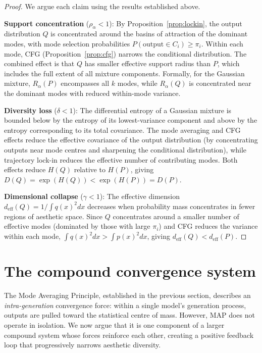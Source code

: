 \documentclass[11pt]{article}
\begin{document}
\begin{proof}
We argue each claim using the results established above.

\textbf{Support concentration} ($\rho_\alpha < 1$): By Proposition~\ref{prop:lockin}, the output distribution $Q$ is concentrated around the basins of attraction of the dominant modes, with mode selection probabilities $P(\text{output} \in C_i) \geq \pi_i$. Within each mode, CFG (Proposition~\ref{prop:cfg}) narrows the conditional distribution. The combined effect is that $Q$ has smaller effective support radius than $P$, which includes the full extent of all mixture components. Formally, for the Gaussian mixture, $R_\alpha(P)$ encompasses all $k$ modes, while $R_\alpha(Q)$ is concentrated near the dominant modes with reduced within-mode variance.

\textbf{Diversity loss} ($\delta < 1$): The differential entropy of a Gaussian mixture is bounded below by the entropy of its lowest-variance component and above by the entropy corresponding to its total covariance. The mode averaging and CFG effects reduce the effective covariance of the output distribution (by concentrating outputs near mode centres and sharpening the conditional distribution), while trajectory lock-in reduces the effective number of contributing modes. Both effects reduce $H(Q)$ relative to $H(P)$, giving $D(Q) = \exp(H(Q)) < \exp(H(P)) = D(P)$.

\textbf{Dimensional collapse} ($\gamma < 1$): The effective dimension $d_{\mathrm{eff}}(Q) = 1/\int q(x)^2 dx$ decreases when probability mass concentrates in fewer regions of aesthetic space. Since $Q$ concentrates around a smaller number of effective modes (dominated by those with large $\pi_i$) and CFG reduces the variance within each mode, $\int q(x)^2 dx > \int p(x)^2 dx$, giving $d_{\mathrm{eff}}(Q) < d_{\mathrm{eff}}(P)$.
\end{proof}

\section{The compound convergence system}\label{sec:compound}

The Mode Averaging Principle, established in the previous section, describes an \textit{intra-generation} convergence force: within a single model's generation process, outputs are pulled toward the statistical centre of mass. However, MAP does not operate in isolation. We now argue that it is one component of a larger compound system whose forces reinforce each other, creating a positive feedback loop that progressively narrows aesthetic diversity.
\end{document}
